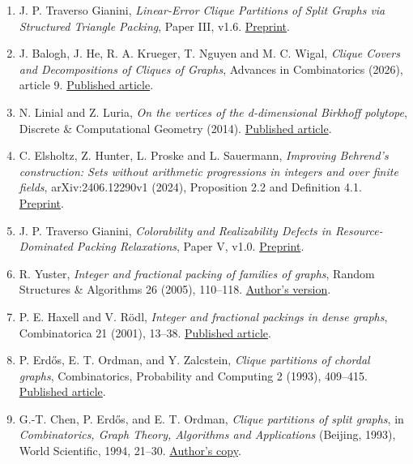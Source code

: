 \documentclass[english,11pt,a4paper]{article}
\begin{document}
\begin{enumerate}
\def\labelenumi{\arabic{enumi}.}
\item
  J. P. Traverso Gianini, \emph{Linear-Error Clique Partitions of Split Graphs via Structured Triangle Packing}, Paper III, v1.6. \href{https://github.com/jtraverso/erdos-81-chordal-clique-partitions/tree/3cbd90eed41af7e86ac6f1f4b8c796e20a5e661f/preprints/PAPER_III}{Preprint}.
\item
  J. Balogh, J. He, R. A. Krueger, T. Nguyen and M. C. Wigal, \emph{Clique Covers and Decompositions of Cliques of Graphs}, Advances in Combinatorics (2026), article 9. \href{https://doi.org/10.19086/aic/2026.9}{Published article}.
\item
  N. Linial and Z. Luria, \emph{On the vertices of the d-dimensional Birkhoff polytope}, Discrete \& Computational Geometry (2014). \href{https://doi.org/10.1007/s00454-013-9554-5}{Published article}.
\item
  C. Elsholtz, Z. Hunter, L. Proske and L. Sauermann, \emph{Improving Behrend's construction: Sets without arithmetic progressions in integers and over finite fields}, arXiv:2406.12290v1 (2024), Proposition 2.2 and Definition 4.1. \href{https://arxiv.org/html/2406.12290v1}{Preprint}.
\item
  J. P. Traverso Gianini, \emph{Colorability and Realizability Defects in Resource-Dominated Packing Relaxations}, Paper V, v1.0. \href{https://github.com/jtraverso/erdos-81-chordal-clique-partitions/tree/3cbd90eed41af7e86ac6f1f4b8c796e20a5e661f/preprints/PAPER_V}{Preprint}.
\item
  R. Yuster, \emph{Integer and fractional packing of families of graphs}, Random Structures \& Algorithms 26 (2005), 110--118. \href{https://math.haifa.ac.il/raphy/papers/fracpack.pdf}{Author's version}.
\item
  P. E. Haxell and V. Rödl, \emph{Integer and fractional packings in dense graphs}, Combinatorica 21 (2001), 13--38. \href{https://doi.org/10.1007/s004930170003}{Published article}.
\item
  P. Erdős, E. T. Ordman, and Y. Zalcstein, \emph{Clique partitions of chordal graphs}, Combinatorics, Probability and Computing 2 (1993), 409--415. \href{https://doi.org/10.1017/S0963548300000808}{Published article}.
\item
  G.-T. Chen, P. Erdős, and E. T. Ordman, \emph{Clique partitions of split graphs}, in \emph{Combinatorics, Graph Theory, Algorithms and Applications} (Beijing, 1993), World Scientific, 1994, 21--30. \href{https://ordman.net/MathResearch/CEOClique_Parts.pdf}{Author's copy}.

\end{enumerate}
\end{document}
